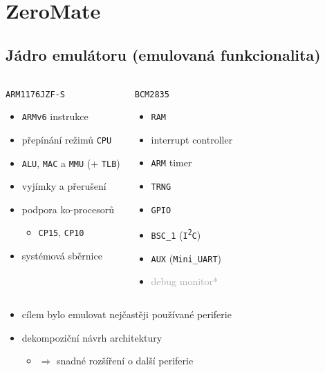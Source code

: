 \documentclass[compress]{beamer}
\begin{document}
\section{ZeroMate}

\subsection{Jádro emulátoru (emulovaná funkcionalita)}

\begin{frame}
	\begin{columns}
		\begin{block}{\texttt{ARM1176JZF-S}}
			\begin{itemize}
				\item \texttt{ARMv6} instrukce
				\item přepínání režimů \texttt{CPU}
				\item \texttt{ALU}, \texttt{MAC} a \texttt{MMU} (+ \texttt{TLB})
				\item vyjímky a přerušení
				\item podpora ko-procesorů
				\begin{itemize}
					\item \texttt{CP15}, \texttt{CP10}
				\end{itemize}
				\item systémová sběrnice
			\end{itemize}
		\end{block}
		\begin{block}{\texttt{BCM2835}}
			\begin{itemize}
				\item \texttt{RAM}
				\item interrupt controller
				\item \texttt{ARM} timer
				\item \texttt{TRNG}
				\item \texttt{GPIO}
				\item \texttt{BSC\_1} (\texttt{I\textsuperscript{2}C})
				\item \texttt{AUX} (\texttt{Mini\_UART})
				\item \textcolor{darkgray}{debug monitor*} 
			\end{itemize}
		\end{block}
	\end{columns}
	\vspace{0.4cm}
	\noindent\makebox[\linewidth]{\rule{\textwidth}{0.4pt}}
	\vspace{-0.4cm}
	\begin{itemize}
		\item cílem bylo emulovat nejčastěji používané periferie
		\item dekompoziční návrh architektury 
		\begin{itemize}
			\item $\Rightarrow$ snadné rozšíření o další periferie
		\end{itemize}
	\end{itemize}
\end{frame}
\end{document}
